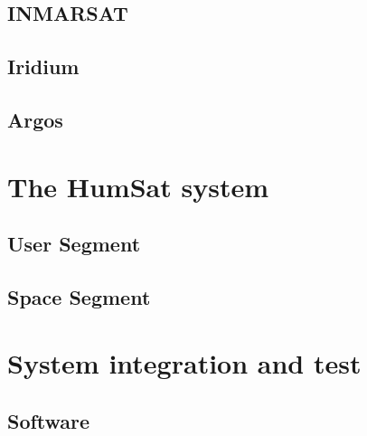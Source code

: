 \subsection{INMARSAT}
\label{sec:INMARSAT}

\lipsum

\subsection{Iridium}
\label{sec:Iridium}

\lipsum

\subsection{Argos}
\label{sec:Argos}

\lipsum


\section{The HumSat system}
\label{sec:NetworkOp_HumSat}

\lipsum

\subsection{User Segment}
\label{sec:HumSat_User}

\lipsum

\subsection{Space Segment}
\label{sec:HumSat_Space}

\lipsum
    

\section{System integration and test}
\label{sec:NetworkOp_Integration}

\lipsum

\subsection{Software}
\label{sec:Integration_Software}

